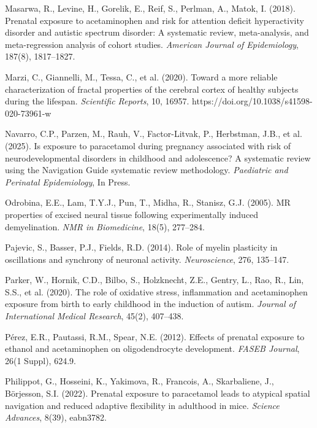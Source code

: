 \documentclass[11pt]{article}
\begin{document}
\begin{thebibliography}{99}
Masarwa, R., Levine, H., Gorelik, E., Reif, S., Perlman, A., Matok, I. (2018).
Prenatal exposure to acetaminophen and risk for attention deficit hyperactivity disorder and autistic spectrum disorder: A systematic review, meta-analysis, and meta-regression analysis of cohort studies.
\textit{American Journal of Epidemiology}, 187(8), 1817--1827.

Marzi, C., Giannelli, M., Tessa, C., et al. (2020).
Toward a more reliable characterization of fractal properties of the cerebral cortex of healthy subjects during the lifespan.
\textit{Scientific Reports}, 10, 16957.
https://doi.org/10.1038/s41598-020-73961-w

Navarro, C.P., Parzen, M., Rauh, V., Factor-Litvak, P., Herbstman, J.B., et al. (2025).
Is exposure to paracetamol during pregnancy associated with risk of neurodevelopmental disorders in childhood and adolescence? A systematic review using the Navigation Guide systematic review methodology.
\textit{Paediatric and Perinatal Epidemiology}, In Press.

Odrobina, E.E., Lam, T.Y.J., Pun, T., Midha, R., Stanisz, G.J. (2005).
MR properties of excised neural tissue following experimentally induced demyelination.
\textit{NMR in Biomedicine}, 18(5), 277--284.

Pajevic, S., Basser, P.J., Fields, R.D. (2014).
Role of myelin plasticity in oscillations and synchrony of neuronal activity.
\textit{Neuroscience}, 276, 135--147.

Parker, W., Hornik, C.D., Bilbo, S., Holzknecht, Z.E., Gentry, L., Rao, R., Lin, S.S., et al. (2020).
The role of oxidative stress, inflammation and acetaminophen exposure from birth to early childhood in the induction of autism.
\textit{Journal of International Medical Research}, 45(2), 407--438.

Pérez, E.R., Pautassi, R.M., Spear, N.E. (2012).
Effects of prenatal exposure to ethanol and acetaminophen on oligodendrocyte development.
\textit{FASEB Journal}, 26(1 Suppl), 624.9.

Philippot, G., Hosseini, K., Yakimova, R., Francois, A., Skarbaliene, J., Börjesson, S.I. (2022).
Prenatal exposure to paracetamol leads to atypical spatial navigation and reduced adaptive flexibility in adulthood in mice.
\textit{Science Advances}, 8(39), eabn3782.


\end{thebibliography}
\end{document}
